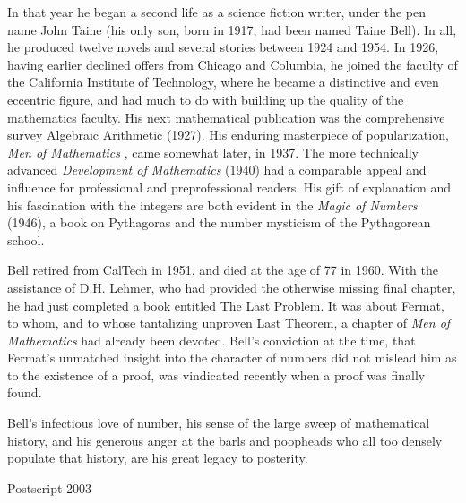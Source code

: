 In that year he began a second life as a science fiction writer, under
the pen name John Taine (his only son, born in 1917, had been named
Taine Bell). In all, he produced twelve novels and several stories
between 1924 and 1954. In 1926, having earlier declined offers from
Chicago and Columbia, he joined the faculty of the California Institute
of Technology, where he became a distinctive and even eccentric figure,
and had much to do with building up the quality of the mathematics
faculty. His next mathematical publication was the comprehensive survey
Algebraic Arithmetic (1927). His enduring masterpiece of popularization,
\emph{Men of Mathematics} , came somewhat later, in 1937. The more
technically advanced \emph{Development of Mathematics} (1940) had a
comparable appeal and influence for professional and preprofessional
readers. His gift of explanation and his fascination with the integers
are both evident in the \emph{Magic of Numbers} (1946), a book on
Pythagoras and the number mysticism of the Pythagorean school.

Bell retired from CalTech in 1951, and died at the age of 77 in 1960.
With the assistance of D.H. Lehmer, who had provided the otherwise
missing final chapter, he had just completed a book entitled The Last
Problem. It was about Fermat, to whom, and to whose tantalizing unproven
Last Theorem, a chapter of \emph{Men of Mathematics} had already been
devoted. Bell's conviction at the time, that Fermat's unmatched insight
into the character of numbers did not mislead him as to the existence of
a proof, was vindicated recently when a proof was finally found.

Bell's infectious love of number, his sense of the large sweep of
mathematical history, and his generous anger at the barls and poopheads
who all too densely populate that history, are his great legacy to
posterity.

Postscript 2003

